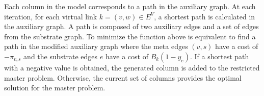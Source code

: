 \documentclass[article]{llncs}
\begin{document}
Each column in the model corresponds to a path in the auxiliary graph. At each iteration, for each virtual link $k = (v,w) \in E^V$, a shortest path is calculated in the auxiliary graph. A path is composed of two auxiliary edges and a set of edges from the substrate graph. To minimize the function above is equivalent to find a path in the modified auxiliary graph where the meta edges $(v,s)$ have a cost of $-\pi_{v,s}$ and the substrate edges $e$ have a cost of $B_{k}(1 - y_{e})$. If a shortest path with a negative value is obtained, the generated column is added to the restricted master problem. Otherwise, the current set of columns provides the optimal solution for the master problem.

\end{document}
